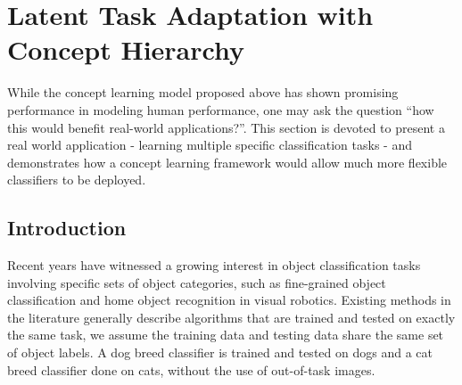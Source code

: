 \chapter{Latent Task Adaptation with Concept Hierarchy}

While the concept learning model proposed above has shown promising performance in modeling human performance, one may ask the question ``how this would benefit real-world applications?''. This section is devoted to present a real world application - learning multiple specific classification tasks - and demonstrates how a concept learning framework would allow much more flexible classifiers to be deployed.

\section{Introduction}
Recent years have witnessed a growing interest in object classification tasks involving specific sets of object categories, such as fine-grained object classification \cite{farrell2011birdlets, khosla2011novel} and home object recognition in visual robotics. Existing methods in the literature generally describe algorithms that are trained and tested on exactly the same task, \ie we assume the training data and testing data share the same set of object labels. A dog breed classifier is trained and tested on dogs and a cat breed classifier done on cats, without the use of out-of-task images.

